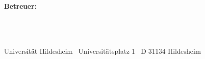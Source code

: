 \begin{titlepage}
\begin{center}
    \Huge{\textbf{\titel}}
    \vspace{1cm}
\end{center}
\begin{center}
    \vspace{1cm}
    \huge{\textbf{\autor\\}}
    \vspace{1cm}
    \LARGE{\matnr\\}
    \vspace{0,5cm}
    \LARGE{\email}
\end{center}
\vspace{1cm}
\begin{center}
    \centering
    \LARGE{\textbf{Betreuer:}} \\
    \LARGE{\erstgutachter} \\
    \LARGE{\zweitgutachter} ~\\
\end{center}
\vspace{0.5cm}
\begin{flushright}
\end{flushright}
\begin{center}
    \small{\arbeitsgruppe \ \textbullet \ \institut \\ Universit\"at Hildesheim
    \textbullet \ Universit\"atsplatz 1 \textbullet \ D-31134 Hildesheim}
\end{center}
\end{titlepage}
\restoregeometry